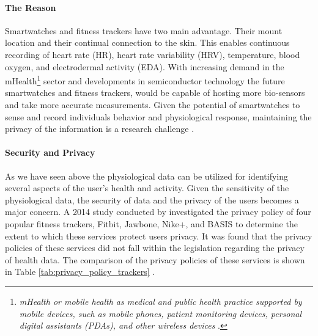 \paragraph{The Reason} Smartwatches and fitness trackers have two main advantage. Their mount location and their continual connection to the skin. This enables continuous recording of heart rate (HR), heart rate variability (HRV), temperature, blood oxygen, and electrodermal activity (EDA). With increasing demand in the mHealth\footnote{\textit{mHealth or mobile
health as medical and public health practice supported by mobile devices, such as mobile phones, patient monitoring devices, personal digital assistants (PDAs), and other wireless devices} \cite{who_global_observatory_for_ehealth_mhealth:_2011}.} sector and developments in semiconductor technology the future smartwatches and fitness trackers, would be capable of hosting more bio-sensors and take more accurate measurements. Given the potential of smartwatches to sense and record individuals behavior and physiological response, maintaining the privacy of the information is a research challenge \cite{rawassizadeh_wearables:_2014}.

\paragraph{Security and Privacy} As we have seen above the physiological data can be utilized for identifying several aspects of the user's health and activity. Given the sensitivity of the physiological data, the security of data and the privacy of the users becomes a major concern. A 2014 study conducted by \citeauthor{paul2014privacy} investigated the privacy policy of four popular fitness trackers, Fitbit, Jawbone, Nike+, and BASIS to determine the extent to which these services protect users privacy. It was found that the privacy policies of these services did not fall within the legislation regarding the privacy of health data. The comparison of the privacy policies of these services is shown in Table \ref{tab:privacy_policy_trackers} \cite{paul2014privacy}.

